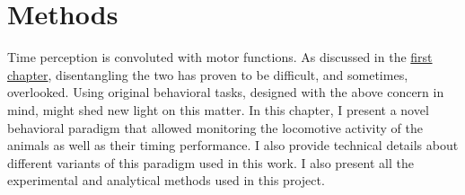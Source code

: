 \chapter{Methods} 
\label{ch:methods:methods}
Time perception is convoluted with motor functions.
As discussed in the \hyperref[ch:intro:intro]{first chapter}, disentangling the two has proven to be difficult, and sometimes, overlooked.
Using original behavioral tasks, designed with the above concern in mind, might shed new light on this matter.
In this chapter, I present a novel behavioral paradigm that allowed monitoring the locomotive activity of the animals as well as their timing performance.
I also provide technical details about different variants of this paradigm used in this work.
I also present all the experimental and analytical methods used in this project.




